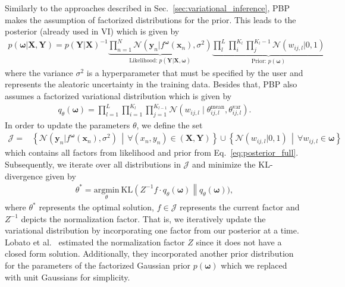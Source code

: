\documentclass[runningheads]{llncs}
\begin{document}
Similarly to the approaches described in Sec.~\ref{sec:variational_inference}, PBP makes the assumption of factorized distributions for the prior.
This leads to the posterior (already used in VI) which is given by
\begin{align}
    p(\boldsymbol{\omega} | \mathbf{X}, \mathbf{Y}) =
    p(\mathbf{Y} |\mathbf{X})^{-1}
    \underbrace{\prod_{n=1}^{N} \mathcal{N}\left( \mathbf{y}_n | f^{\boldsymbol{\omega}}\left( \mathbf{x}_n \right), \sigma^2 \right)}_{\text{Likelihood: } p(\mathbf{Y} | \mathbf{X}, \boldsymbol{\omega})}
    \underbrace{ \prod_{l}^{L} \prod_{i}^{K_l} \prod_{j}^{K_l-1}\mathcal{N}\left( w_{ij,l} | 0, 1\right)}_{\text{Prior: }p(\boldsymbol{\omega})} \label{eq:posterior_full}
\end{align}
where the variance $\sigma^2$ is a hyperparameter that must be specified by the user and represents the aleatoric uncertainty in the training data.
Besides that, PBP also assumes a factorized variational distribution which is given by
\begin{align}
    q_\theta\left(\boldsymbol{\omega}\right) = \prod_{l=1}^{L}\prod_{i=1}^{K_l}\prod_{j=1}^{K_{l-1}} \mathcal{N}\left( w_{ij,l} \mid \theta^\mathrm{mean}_{ij,l}, \theta^\mathrm{var}_{ij,l}\right)\label{eq:variational_factorized_bpb}.
\end{align}
In order to update the parameters $\theta$, we define the set 
\begin{align}
    \mathcal{J} = &\left\{ \mathcal{N}\left( \mathbf{y}_n | f^{\boldsymbol{\omega}}\left( \mathbf{x}_n \right), \sigma^2 \right) \,\middle|\, \forall (x_n, y_n) \in (\mathbf{X}, \mathbf{Y})\right\} \cup
    \left\{ \mathcal{N}\left( w_{ij,l}|0, 1\right) \,\middle|\, \forall w_{ij,l} \in \boldsymbol{\omega} \right\}
\end{align}
which contains all factors from likelihood and prior from Eq.~\ref{eq:posterior_full}.
Subsequently, we iterate over all distributions in $\mathcal{J}$ and minimize the KL-divergence given by
\begin{align}
    \theta^* = \underset{\theta}{\mathrm{argmin}}\  \mathrm{KL}\left(Z^{-1}f\cdot q_\theta(\boldsymbol{\omega})\right \| q_\theta(\boldsymbol{\omega})),
\end{align}
where $\theta^*$ represents the optimal solution, $f \in \mathcal{J}$ represents the current factor and $Z^{-1}$ depicts the normalization factor.
That is, we iteratively update the variational distribution by incorporating one factor from our posterior at a time.
Lobato et al.~\cite{hernandez2015probabilistic} estimated the normalization factor $Z$ since it does not have a closed form solution.
Additionally, they incorporated another prior distribution for the parameters of the factorized Gaussian prior $p(\boldsymbol{\omega})$ which we replaced with unit Gaussians for simplicity.
\end{document}
